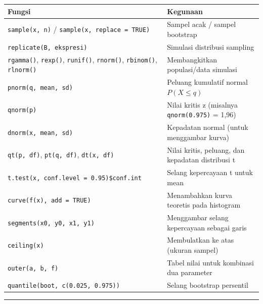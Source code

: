 \documentclass[
  indonesian,
  letterpaper,
]{book}
\newcounter{none} %
\begin{document}
{\def\LTcaptype{none} %
\begin{longtable}[]{@{}
  >{\raggedright\arraybackslash}p{}
  >{\raggedright\arraybackslash}p{}@{}}
\toprule\noalign{}
\begin{minipage}[b]{\linewidth}\raggedright
Fungsi
\end{minipage} & \begin{minipage}[b]{\linewidth}\raggedright
Kegunaan
\end{minipage} \\
\midrule\noalign{}
\endhead
\bottomrule\noalign{}
\endlastfoot
\texttt{sample(x,\ n)} / \texttt{sample(x,\ replace\ =\ TRUE)} & Sampel
acak / sampel bootstrap \\
\texttt{replicate(B,\ ekspresi)} & Simulasi distribusi sampling \\
\texttt{rgamma()}, \texttt{rexp()}, \texttt{runif()}, \texttt{rnorm()},
\texttt{rbinom()}, \texttt{rlnorm()} & Membangkitkan populasi/data
simulasi \\
\texttt{pnorm(q,\ mean,\ sd)} & Peluang kumulatif normal
\(P(X \leq q)\) \\
\texttt{qnorm(p)} & Nilai kritis z (misalnya \texttt{qnorm(0.975)} =
1,96) \\
\texttt{dnorm(x,\ mean,\ sd)} & Kepadatan normal (untuk menggambar
kurva) \\
\texttt{qt(p,\ df)}, \texttt{pt(q,\ df)}, \texttt{dt(x,\ df)} & Nilai
kritis, peluang, dan kepadatan distribusi t \\
\texttt{t.test(x,\ conf.level\ =\ 0.95)\$conf.int} & Selang kepercayaan
t untuk mean \\
\texttt{curve(f(x),\ add\ =\ TRUE)} & Menambahkan kurva teoretis pada
histogram \\
\texttt{segments(x0,\ y0,\ x1,\ y1)} & Menggambar selang kepercayaan
sebagai garis \\
\texttt{ceiling(x)} & Membulatkan ke atas (ukuran sampel) \\
\texttt{outer(a,\ b,\ f)} & Tabel nilai untuk kombinasi dua parameter \\
\texttt{quantile(boot,\ c(0.025,\ 0.975))} & Selang bootstrap
persentil \\
\end{longtable}
}

\begin{center}\rule{0.5\linewidth}{0.5pt}\end{center}
\end{document}

